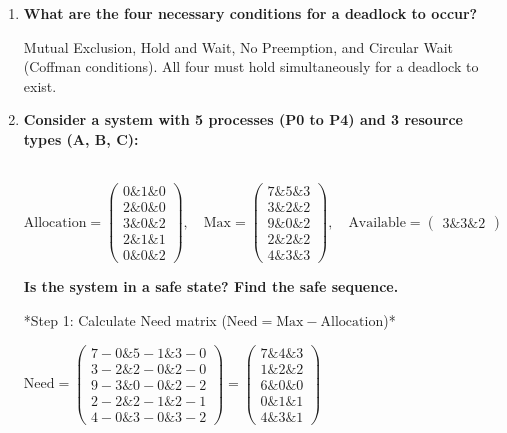 \documentclass[12pt,a4paper]{article}
\newcommand{\Q}[1]{\textbf{#1}\par\noindent\ignorespaces}
\begin{document}
\begin{tcolorbox}[exambox, title={\textbf{Frequently Asked / Viva Questions}}]
\begin{enumerate}[topsep=0pt, label=\textbf{Q\arabic*.}, itemsep=5pt]
  \item \Q{What are the four necessary conditions for a deadlock to occur?}
    Mutual Exclusion, Hold and Wait, No Preemption, and Circular Wait (Coffman conditions). All four must hold simultaneously for a deadlock to exist.
  \item \Q{Consider a system with 5 processes (P0 to P4) and 3 resource types (A, B, C):}\\
    $\text{Allocation} = \begin{pmatrix} 0 \& 1 \& 0 \\ 2 \& 0 \& 0 \\ 3 \& 0 \& 2 \\ 2 \& 1 \& 1 \\ 0 \& 0 \& 2 \end{pmatrix}, \quad \text{Max} = \begin{pmatrix} 7 \& 5 \& 3 \\ 3 \& 2 \& 2 \\ 9 \& 0 \& 2 \\ 2 \& 2 \& 2 \\ 4 \& 3 \& 3 \end{pmatrix}, \quad \text{Available} = \begin{pmatrix} 3 \& 3 \& 2 \end{pmatrix}$\par
    \textbf{Is the system in a safe state? Find the safe sequence.}\par
    *Step 1: Calculate Need matrix ($\text{Need} = \text{Max} - \text{Allocation}$)*\par
    $\text{Need} = \begin{pmatrix} 7-0 \& 5-1 \& 3-0 \\ 3-2 \& 2-0 \& 2-0 \\ 9-3 \& 0-0 \& 2-2 \\ 2-2 \& 2-1 \& 2-1 \\ 4-0 \& 3-0 \& 3-2 \end{pmatrix} = \begin{pmatrix} 7 \& 4 \& 3 \\ 1 \& 2 \& 2 \\ 6 \& 0 \& 0 \\ 0 \& 1 \& 1 \\ 4 \& 3 \& 1 \end{pmatrix}$\par

\end{enumerate}
\end{tcolorbox}
\end{document}
